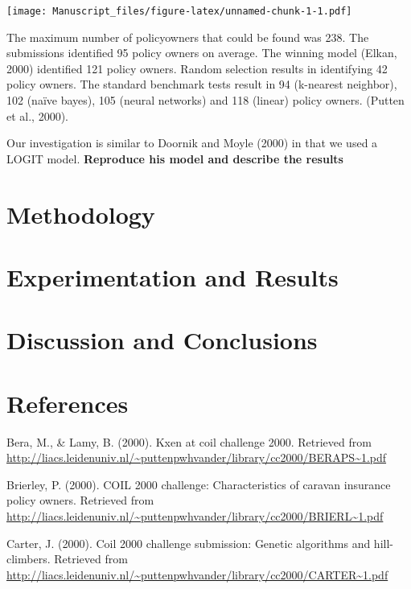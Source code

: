 \documentclass[man]{apa6}
\begin{document}
\texttt{[image: Manuscript\_files/figure-latex/unnamed-chunk-1-1.pdf]}

The maximum number of policyowners that could be found was 238. The submissions identified 95 policy owners on average. The winning model (Elkan, 2000) identified 121 policy owners. Random selection results in identifying 42 policy owners. The standard benchmark tests result in 94 (k-nearest neighbor), 102 (naïve bayes), 105 (neural networks) and 118 (linear) policy owners. (Putten et al., 2000).

Our investigation is similar to Doornik and Moyle (2000) in that we used a LOGIT model. \textbf{Reproduce his model and describe the results}

\hypertarget{methodology}{%
\section{Methodology}\label{methodology}}

\hypertarget{experimentation-and-results}{%
\section{Experimentation and Results}\label{experimentation-and-results}}

\hypertarget{discussion-and-conclusions}{%
\section{Discussion and Conclusions}\label{discussion-and-conclusions}}

\newpage

\hypertarget{references}{%
\section{References}\label{references}}

\begingroup
\setlength{\parindent}{-0.5in}
\setlength{\leftskip}{0.5in}

\hypertarget{refs}{}
\leavevmode\hypertarget{ref-Bera}{}%
Bera, M., \& Lamy, B. (2000). Kxen at coil challenge 2000. Retrieved from \url{http://liacs.leidenuniv.nl/~puttenpwhvander/library/cc2000/BERAPS~1.pdf}

\leavevmode\hypertarget{ref-Brierley}{}%
Brierley, P. (2000). COIL 2000 challenge: Characteristics of caravan insurance policy owners. Retrieved from \url{http://liacs.leidenuniv.nl/~puttenpwhvander/library/cc2000/BRIERL~1.pdf}

\leavevmode\hypertarget{ref-Carter}{}%
Carter, J. (2000). Coil 2000 challenge submission: Genetic algorithms and hill-climbers. Retrieved from \url{http://liacs.leidenuniv.nl/~puttenpwhvander/library/cc2000/CARTER~1.pdf}
\end{document}
